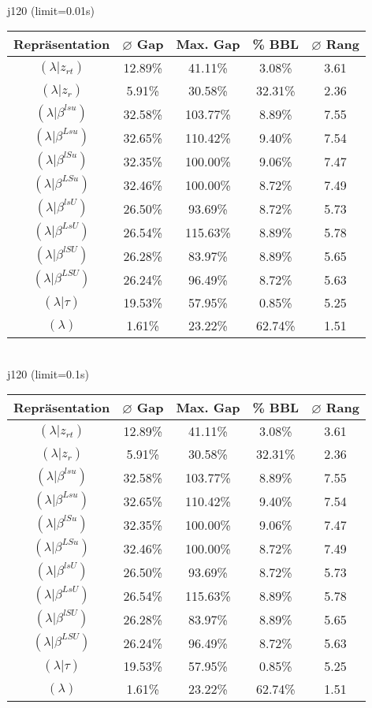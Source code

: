 \documentclass{scrartcl}
\begin{document}
\\[8pt]j120 (limit=0.01s)\\\begin{tabular}{ccccc}
\hline
Repräsentation & $\varnothing$ Gap & Max. Gap & \% BBL & $\varnothing$ Rang\\[3pt]
\hline
$(\lambda|z_{rt})$&12.89\%&41.11\%&3.08\%&3.61\\
\hline
$(\lambda|z_r)$&5.91\%&30.58\%&32.31\%&2.36\\
\hline
$(\lambda|\beta^{lsu})$&32.58\%&103.77\%&8.89\%&7.55\\
\hline
$(\lambda|\beta^{Lsu})$&32.65\%&110.42\%&9.40\%&7.54\\
\hline
$(\lambda|\beta^{lSu})$&32.35\%&100.00\%&9.06\%&7.47\\
\hline
$(\lambda|\beta^{LSu})$&32.46\%&100.00\%&8.72\%&7.49\\
\hline
$(\lambda|\beta^{lsU})$&26.50\%&93.69\%&8.72\%&5.73\\
\hline
$(\lambda|\beta^{LsU})$&26.54\%&115.63\%&8.89\%&5.78\\
\hline
$(\lambda|\beta^{lSU})$&26.28\%&83.97\%&8.89\%&5.65\\
\hline
$(\lambda|\beta^{LSU})$&26.24\%&96.49\%&8.72\%&5.63\\
\hline
$(\lambda|\tau)$&19.53\%&57.95\%&0.85\%&5.25\\
\hline
$(\lambda)$&1.61\%&23.22\%&62.74\%&1.51\\\hline
\end{tabular}
\\[8pt]j120 (limit=0.1s)\\\begin{tabular}{ccccc}
\hline
Repräsentation & $\varnothing$ Gap & Max. Gap & \% BBL & $\varnothing$ Rang\\[3pt]
\hline
$(\lambda|z_{rt})$&12.89\%&41.11\%&3.08\%&3.61\\
\hline
$(\lambda|z_r)$&5.91\%&30.58\%&32.31\%&2.36\\
\hline
$(\lambda|\beta^{lsu})$&32.58\%&103.77\%&8.89\%&7.55\\
\hline
$(\lambda|\beta^{Lsu})$&32.65\%&110.42\%&9.40\%&7.54\\
\hline
$(\lambda|\beta^{lSu})$&32.35\%&100.00\%&9.06\%&7.47\\
\hline
$(\lambda|\beta^{LSu})$&32.46\%&100.00\%&8.72\%&7.49\\
\hline
$(\lambda|\beta^{lsU})$&26.50\%&93.69\%&8.72\%&5.73\\
\hline
$(\lambda|\beta^{LsU})$&26.54\%&115.63\%&8.89\%&5.78\\
\hline
$(\lambda|\beta^{lSU})$&26.28\%&83.97\%&8.89\%&5.65\\
\hline
$(\lambda|\beta^{LSU})$&26.24\%&96.49\%&8.72\%&5.63\\
\hline
$(\lambda|\tau)$&19.53\%&57.95\%&0.85\%&5.25\\
\hline
$(\lambda)$&1.61\%&23.22\%&62.74\%&1.51\\\hline
\end{tabular}
\end{document}
